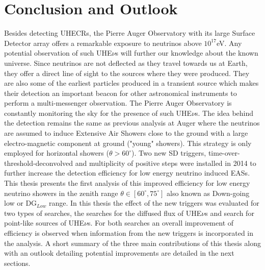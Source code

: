 
\chapter{Conclusion and Outlook}
\label{chap:conc}

Besides detecting \glspl{UHECR}, the Pierre Auger Observatory with its large Surface Detector array offers a remarkable exposure to neutrinos above $10^{17}$eV. Any potential observation of such UHE$\nu$s will further our knowledge about the known universe. Since neutrinos are not deflected as they travel towards us at Earth, they offer a direct line of sight to the sources where they were produced. They are also some of the earliest particles produced in a transient source which makes their detection an important beacon for other astronomical instruments to perform a multi-messenger observation. The Pierre Auger Observatory is constantly monitoring the sky for the presence of such UHE$\nu$s. The idea behind the detection remains the same as previous analysis at Auger where the neutrinos are assumed to induce Extensive Air Showers close to the ground with a large electro-magnetic component at ground ("young" showers). This strategy is only employed for horizontal showers ($\theta > 60^{\circ}$). Two new SD triggers, time-over-threshold-deconvolved and multiplicity of positive steps were installed in 2014 to further increase the detection efficiency for low energy neutrino induced EASs. This thesis presents the first analysis of this improved efficiency for low energy neutrino showers in the zenith range $\theta \in [60^{\circ},75^\circ]$ also known as Down-going low or DG$_{Low}$ range. In this thesis the effect of the new triggers was evaluated for two types of searches, the searches for the diffused flux of UHE$\nu$s and search for point-like sources of UHE$\nu$s. For both searches an overall improvement of efficiency is observed when information from the new triggers is incorporated in the analysis. A short summary of the three main contributions of this thesis along with an outlook detailing potential improvements are detailed in the next sections. 
